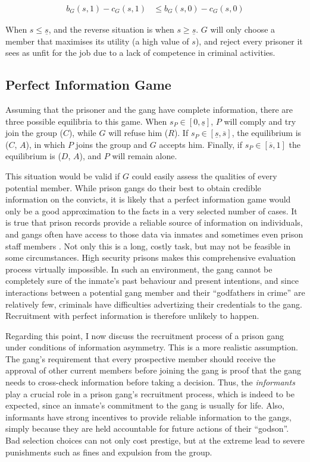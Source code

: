 \documentclass[a4paper,12pt]{article}
\begin{document}
\begin{align}
b_G\left(s,1\right) - c_G\left(s,1\right) &\leq b_G\left(s,0\right) - c_G\left(s,0\right)
\end{align}

When $s\leq \underline{s}$, and the reverse situation is when $s \geq \underline{s}$. $G$ will only choose a member that maximises its utility (a high value of $s$), and reject every prisoner it sees as unfit for the job due to a lack of competence in criminal activities.

\subsection{Perfect Information Game}

Assuming that the prisoner and the gang have complete information, there are three possible equilibria to this game. When $s_P \in \left[0, \underline{s} \right]$, $P$ will comply and try join the group ($C$), while $G$ will refuse him ($R$). If $s_P \in \left[\underline{s}, \overline{s} \right]$, the equilibrium is ($C$, $A$), in which $P$ joins the group and $G$ accepts him. Finally, if $s_P \in \left[\overline{s}, 1 \right]$ the equilibrium is ($D$, $A$), and $P$ will remain alone. 

This situation would be valid if $G$ could easily assess the qualities of every potential member. While prison gangs do their best to obtain credible information on the convicts, it is likely that a perfect information game would only be a good approximation to the facts in a very selected number of cases. It is true that prison records provide a reliable source of information on individuals, and gangs often have access to those data via inmates and sometimes even prison staff members \citep[]{gambetta2009codes}. Not only this is a long, costly task, but may not be feasible in some circumstances. High security prisons makes this comprehensive evaluation process virtually impossible. In such an environment, the gang cannot be completely sure of the inmate's past behaviour and present intentions, and since interactions between a potential gang member and their ``godfathers in crime'' are relatively few, criminals have difficulties advertizing their credentials to the gang. Recruitment with perfect information is therefore unlikely to happen.

Regarding this point, I now discuss the recruitment process of a prison gang under conditions of information asymmetry. This is a more realistic assumption. The gang's requirement that every prospective member should receive the approval of other current members before joining the gang is proof that the gang needs to cross-check information before taking a decision. Thus, the \textit{informants} play a crucial role in a prison gang's recruitment process, which is indeed to be expected, since an inmate's commitment to the gang is usually for life. Also, informants have strong incentives to provide reliable information to the gangs, simply because they are held accountable for future actions of their ``godson''. Bad selection choices can not only cost prestige, but at the extreme lead to severe punishments such as fines and expulsion from the group. 
\end{document}
